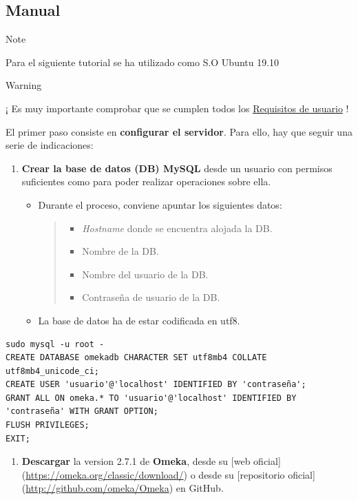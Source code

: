 \documentclass[
]{article}
\providecommand{\tightlist}{%
  \setlength{\itemsep}{0pt}\setlength{\parskip}{0pt}}
\begin{document}
\hypertarget{manual-1}{%
\subsection{Manual}\label{manual-1}}

Note

Para el siguiente tutorial se ha utilizado como S.O Ubuntu 19.10

Warning

¡ Es muy importante comprobar que se cumplen todos los
\protect\hyperlink{requisitos-de-usuario}{Requisitos de usuario} !

El primer paso consiste en \textbf{configurar el servidor}. Para ello,
hay que seguir una serie de indicaciones:

\begin{enumerate}
\def\labelenumi{\arabic{enumi}.}
\tightlist
\item
  \textbf{Crear la base de datos (DB) MySQL} desde un usuario con
  permisos suficientes como para poder realizar operaciones sobre ella.

  \begin{itemize}
  \item
    Durante el proceso, conviene apuntar los siguientes datos:

    \begin{quote}
    \begin{itemize}
    \tightlist
    \item
      \emph{Hostname} donde se encuentra alojada la DB.
    \item
      Nombre de la DB.
    \item
      Nombre del usuario de la DB.
    \item
      Contraseña de usuario de la DB.
    \end{itemize}
    \end{quote}
  \item
    La base de datos ha de estar codificada en {utf8}.
  \end{itemize}
\end{enumerate}

\begin{verbatim}
sudo mysql -u root -
CREATE DATABASE omekadb CHARACTER SET utf8mb4 COLLATE utf8mb4_unicode_ci;
CREATE USER 'usuario'@'localhost' IDENTIFIED BY 'contraseña';
GRANT ALL ON omeka.* TO 'usuario'@'localhost' IDENTIFIED BY 'contraseña' WITH GRANT OPTION;
FLUSH PRIVILEGES;
EXIT;
\end{verbatim}

\begin{enumerate}
\def\labelenumi{\arabic{enumi}.}
\setcounter{enumi}{1}
\tightlist
\item
  \textbf{Descargar} la version 2.7.1 de \textbf{Omeka}, desde su {[}web
  oficial{]}(\url{https://omeka.org/classic/download/}) o desde su
  {[}repositorio oficial{]}(\url{http://github.com/omeka/Omeka}) en
  GitHub.
\end{enumerate}
\end{document}
